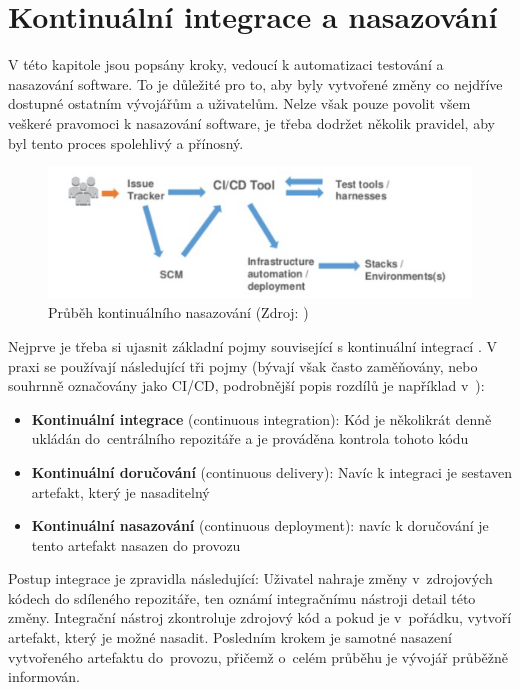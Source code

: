 \documentclass[FM,DP]{tulthesis}
\begin{document}
\section{Kontinuální integrace a nasazování}
\label{section:ci}

V této kapitole jsou popsány kroky, vedoucí k automatizaci testování a nasazování software. To je důležité
pro to, aby byly vytvořené změny co nejdříve dostupné ostatním vývojářům a uživatelům. Nelze však pouze povolit
všem veškeré pravomoci k nasazování software, je třeba dodržet několik pravidel, aby byl tento proces spolehlivý
a přínosný.

\begin{figure}[h]
\center
\includegraphics[width=\textwidth]{ci-cd-pipeline.png}
\caption{Průběh kontinuálního nasazování (Zdroj: \cite{ci-cd-pipeline})}
\label{ci-cd-pipeline}
\end{figure}

Nejprve je třeba si ujasnit základní pojmy související s kontinuální integrací \cite{ci}. V praxi se používají 
následující tři pojmy (bývají však často zaměňovány, nebo souhrnně označovány jako CI/CD, podrobnější popis
rozdílů je například v~\cite{ci-cd}):

\begin{itemize}
\item \textbf{Kontinuální integrace} (continuous integration): Kód je několikrát denně ukládán 
do~centrálního repozitáře a je prováděna kontrola tohoto kódu
\item \textbf{Kontinuální doručování} (continuous delivery): Navíc k integraci je sestaven artefakt, 
který je nasaditelný
\item \textbf{Kontinuální nasazování} (continuous deployment): navíc k doručování je tento artefakt 
nasazen do provozu
\end{itemize}

Postup integrace je zpravidla následující: Uživatel nahraje změny v~zdrojových kódech do sdíleného repozitáře, 
ten oznámí integračnímu nástroji detail této změny. Integrační nástroj zkontroluje zdrojový kód a pokud je 
v~pořádku, vytvoří artefakt, který je možné nasadit. Posledním krokem je samotné nasazení vytvořeného artefaktu 
do~provozu, přičemž o~celém průběhu je vývojář průběžně informován.
\end{document}
